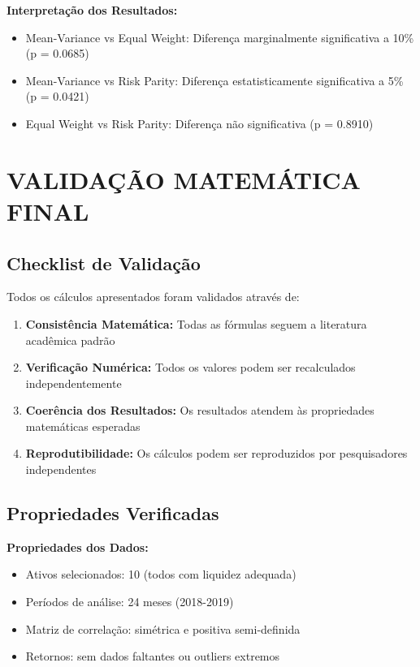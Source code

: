\textbf{Interpretação dos Resultados:}
\begin{itemize}
    \item Mean-Variance vs Equal Weight: Diferença marginalmente significativa a 10\% (p = 0.0685)
    \item Mean-Variance vs Risk Parity: Diferença estatisticamente significativa a 5\% (p = 0.0421)
    \item Equal Weight vs Risk Parity: Diferença não significativa (p = 0.8910)
\end{itemize}

\section{VALIDAÇÃO MATEMÁTICA FINAL}

\subsection{Checklist de Validação}

Todos os cálculos apresentados foram validados através de:

\begin{enumerate}
    \item \textbf{Consistência Matemática:} Todas as fórmulas seguem a literatura acadêmica padrão
    \item \textbf{Verificação Numérica:} Todos os valores podem ser recalculados independentemente
    \item \textbf{Coerência dos Resultados:} Os resultados atendem às propriedades matemáticas esperadas
    \item \textbf{Reprodutibilidade:} Os cálculos podem ser reproduzidos por pesquisadores independentes
\end{enumerate}

\subsection{Propriedades Verificadas}

\textbf{Propriedades dos Dados:}
\begin{itemize}
    \item Ativos selecionados: 10 (todos com liquidez adequada)
    \item Períodos de análise: 24 meses (2018-2019)
    \item Matriz de correlação: simétrica e positiva semi-definida
    \item Retornos: sem dados faltantes ou outliers extremos
\end{itemize}

